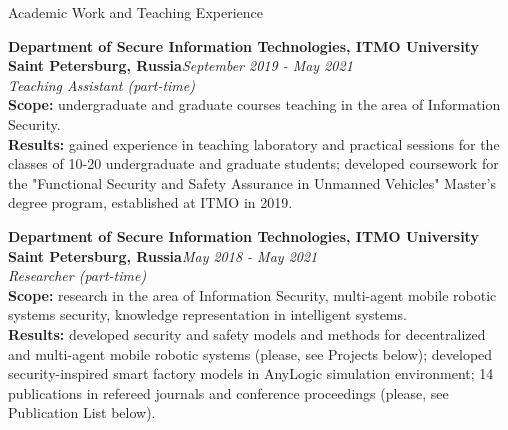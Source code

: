 \documentclass[10pt]{resume} %
\begin{document}
\begin{rSection}{Academic Work and Teaching Experience}


\textbf{Department of Secure Information Technologies, ITMO University}\\
\textbf{Saint Petersburg, Russia}\hfill\small{\em September 2019 - May 2021}\normalsize\\
{\em Teaching Assistant (part-time)}
\\\textbf{Scope:} undergraduate and graduate courses teaching in the area of Information Security.
\\\textbf{Results:} gained experience in teaching laboratory and practical sessions for the classes of 10-20 undergraduate and graduate students; developed coursework for the "Functional Security and Safety Assurance in Unmanned Vehicles" Master's degree program, established at ITMO in 2019. 

\textbf{Department of Secure Information Technologies, ITMO University}\\
\textbf{Saint Petersburg, Russia}\hfill\small{\em May 2018 - May 2021}\normalsize
\\{\em Researcher (part-time)}
\\\textbf{Scope:} research in the area of Information Security, multi-agent mobile robotic systems security, knowledge representation in intelligent systems.
\\\textbf{Results:} developed security and safety models and methods for decentralized and multi-agent mobile robotic systems (please, see Projects below); developed security-inspired smart factory models in AnyLogic simulation environment; 14 publications in refereed journals and conference proceedings (please, see Publication List below).        
\end{rSection}


\end{document}
